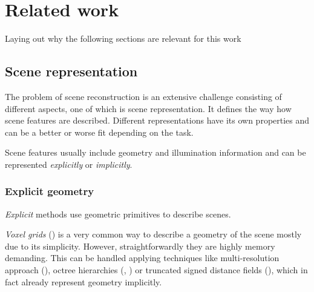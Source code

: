 \chapter{Related work}
\label{chap:related_work}


Laying out why the following sections are relevant for this work




\section{Scene representation}

The problem of scene reconstruction is an extensive challenge consisting of different aspects,
one of which is scene representation.
It defines the way how scene features are described.
Different representations have its own properties and can be a better or worse fit depending on the task.

Scene features usually include geometry and illumination information
and can be represented \textit{explicitly} or \textit{implicitly}.

\subsection{Explicit geometry}

\textit{Explicit} methods use geometric primitives to describe scenes.

\textit{Voxel grids} (\cite{Lombardi_2019}) is a very common way to describe a geometry of the scene mostly due to its simplicity.
However, straightforwardly they are highly memory demanding.
This can be handled applying techniques like multi-resolution approach (\cite{häne2017hierarchical}), octree hierarchies (\cite{riegler2017octnet}, \cite{tatarchenko2017octree})
or truncated signed distance fields (\cite{truncdistfield1996curless}),
which in fact already represent geometry implicitly.


